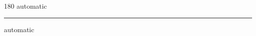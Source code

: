 
\begin{frame}
\begin{center}
\begin{turn}{180}
{\fontsize{2.5cm}{1em}\selectfont automatic}
\end{turn}
\vspace{1em}\par  
\hrule
\vspace{1em}\par  
{\fontsize{2.5cm}{1em}\selectfont automatic}
\end{center}
\end{frame}
